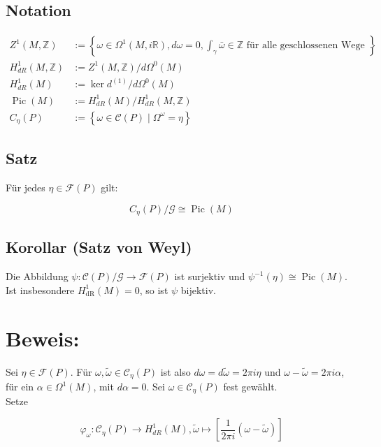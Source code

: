 \documentclass[10pt, letterpaper]{article}
\begin{document}
\subsection*{Notation}
$$
\begin{array}{ll}
Z^{1}(M, \mathbb{Z}) & :=\left\{\omega \in \Omega^{1}(M, i \mathbb{R}), d \omega=0, \int_{\gamma} \bar{\omega} \in \mathbb{Z} \text { für alle geschlossenen Wege }\right\} . \\
H_{d R}^{1}(M, \mathbb{Z}) & :=Z^{1}(M, \mathbb{Z}) / d \Omega^{0}(M) \\
H_{d R}^{1}(M) & :=\operatorname{ker} d^{(1)} / d \Omega^{0}(M) \\
\operatorname{Pic}(M) & :=H_{d R}^{1}(M) / H_{d R}^{1}(M, \mathbb{Z}) \\
C_{\eta}(P) & :=\left\{\omega \in \mathcal{C}(P) \mid \Omega^{\omega}=\eta\right\}
\end{array}
$$

\subsection*{Satz}
Für jedes $\eta \in \mathcal{F}(P)$ gilt:

$$
C_{\eta}(P) / \mathcal{G} \cong \operatorname{Pic}(M)
$$

\subsection*{Korollar (Satz von Weyl)}
Die Abbildung $\psi: \mathcal{C}(P) / \mathcal{G} \rightarrow \mathcal{F}(P)$ ist surjektiv und $\psi^{-1}(\eta) \cong \operatorname{Pic}(M)$. Ist insbesondere $H_{\mathrm{dR}}^{1}(M)=0$, so ist $\psi$ bijektiv.

\section*{Beweis:}
Sei $\eta \in \mathcal{F}(P)$. Für $\omega, \tilde{\omega} \in \mathcal{C}_{\eta}(P)$ ist also $d \omega=d \tilde{\omega}=2 \pi i \eta$ und $\omega-\tilde{\omega}=2 \pi i \alpha$, für ein $\alpha \in \Omega^{1}(M)$, mit $d \alpha=0$. Sei $\omega \in \mathcal{C}_{\eta}(P)$ fest gewählt.\\
Setze

$$
\varphi_{\omega}: \mathcal{C}_{\eta}(P) \rightarrow H_{d R}^{1}(M), \tilde{\omega} \mapsto\left[\frac{1}{2 \pi i}(\omega-\tilde{\omega})\right]
$$
\end{document}
